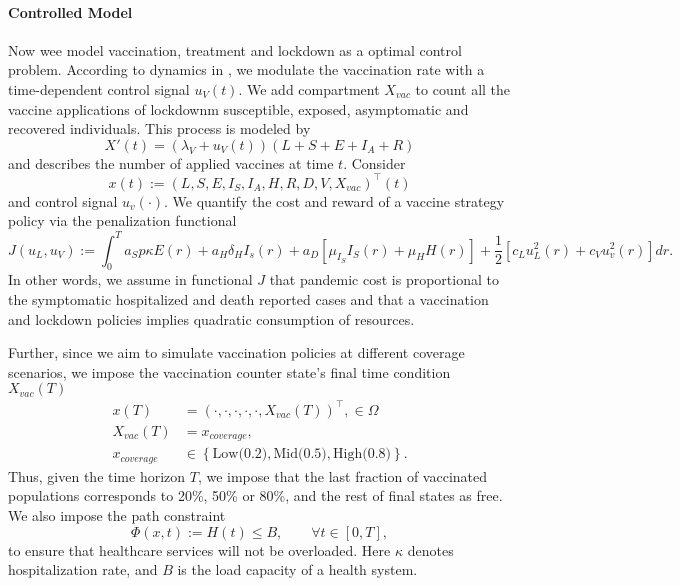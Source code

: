\paragraph{Controlled Model}
Now wee model vaccination, treatment and lockdown as a optimal control problem.
According to dynamics in , we modulate the vaccination
rate with a time-dependent control signal  $u_V(t)$. We add
compartment $X_{vac}$
to count all the vaccine applications of lockdownm susceptible, exposed,
asymptomatic and
recovered individuals. This process is modeled by
\begin{equation}
\label{eqn:counter}
  X'(t) =
    (\lambda_V + u_V(t))(L + S + E + I_A + R)
\end{equation}
and describes the number of applied vaccines at time $t$.
Consider
$$x(t):= (L, S, E, I_S, I_A, H, R, D, V, X_{vac})^{\top}(t)$$
and  control signal $u_v(\cdot)$. We quantify the cost and reward of a vaccine
strategy policy via the penalization functional
\begin{equation}
    \label{eqn:cost_functional}
    J(u_L, u_V):=
        \int _0 ^ T
        a_S p \kappa E(r) +
        a_H \delta_H I_s(r) +
        a_D
        \left[
            \mu_{I_S} I_S(r) + \mu_H H(r)
        \right] +
        \frac{1}{2}
        \left[
            c_L u_L^2(r) +
            c_V u_v^2(r)
        \right]
        dr.
\end{equation}
In other words, we assume in functional $J$ that pandemic cost is proportional
to the symptomatic hospitalized and death reported cases and that a vaccination
and lockdown policies implies quadratic consumption of resources.

    Further, since we aim to simulate vaccination policies at different coverage
scenarios, we impose the vaccination counter state's final time condition
$X_{vac}(T)$
\begin{equation}
    \begin{aligned}
      x(T) &= (\cdot, \cdot, \cdot, \cdot, \cdot, X_{vac }(T))^{\top},
      \in \Omega
      \\
      X_{vac}(T)
        &= x_{cover age},
      \\
      x_{coverage}
        & \in
        \left \{
          \text{Low(0.2)},\text{Mid(0.5)}, \text{High(0.8)}
        \right \} .
    \end{aligned}
\end{equation}
    Thus, given the time horizon $T$, we impose that the last fraction of
vaccinated populations corresponds to 20\%, 50\% or 80\%, and
the rest of final states as free. We also impose the path constraint
\begin{equation}
    \label{eqn:path_constrain}
    \Phi(x,t):= H(t) \leq B,
    \qquad \forall t \in [0, T],
\end{equation}
to ensure that healthcare services will not be overloaded. Here $\kappa$
denotes hospitalization rate, and $B$ is the load capacity of a
health system.

